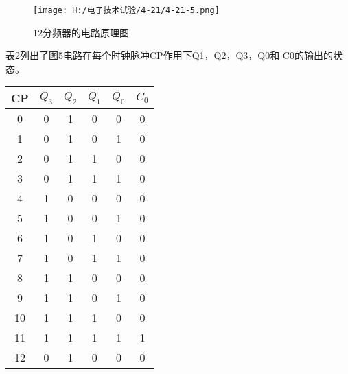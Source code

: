 \documentclass{article}
\begin{document}
    \begin{figure}[h]
        \centering
        \texttt{[image: H:/电子技术试验/4-21/4-21-5.png]}
        \caption{12分频器的电路原理图} \label{fig:aa}
        \end{figure}


        表2列出了图5电路在每个时钟脉冲CP作用下Q1，Q2，Q3，Q0和 C0的输出的状态。\par
        \begin{table}[h]
            \centering  
            \begin{tabular}{c|c|c|c|c|c}
                \hline
                      CP             & $Q_3$  &$Q_2$  &$Q_1$  &$Q_0$  &$C_0$      \\ \hline
                      0              & 0      &1      & 0     & 0     &0 \\ \hline
                      1              & 0      &1      & 0     & 1     &0 \\ \hline
                      2              & 0      &1      & 1     & 0     &0 \\ \hline
                      3              & 0      &1      & 1     & 1     &0 \\ \hline
                      4              & 1      &0      & 0     & 0     &0 \\ \hline
                      5              & 1      &0      & 0     & 1     &0 \\ \hline
                      6              & 1      &0      & 1     & 0     &0 \\ \hline
                      7              & 1      &0      & 1     & 1     &0 \\ \hline
                      8              & 1      &1      & 0     & 0     &0 \\ \hline
                      9              & 1      &1      & 0     & 1     &0 \\ \hline
                      10             & 1      &1      & 1     & 0     &0 \\ \hline
                      11             & 1      &1      & 1     & 1     &1 \\ \hline
                      12             & 0      &1      & 0     & 0     &0 \\ \hline
                    \end{tabular}
          \end{table}

    \par
    
\end{document}
